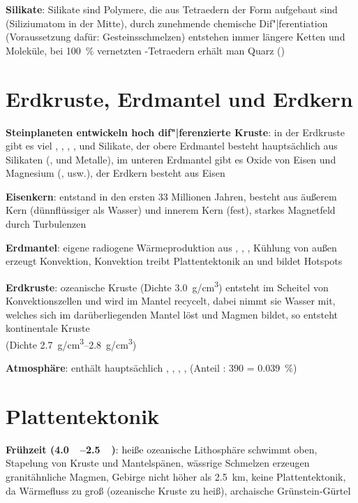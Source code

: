 \textbf{Silikate}:
Silikate sind Polymere, die aus Tetraedern der Form  aufgebaut sind
(Siliziumatom in der Mitte),
durch zunehmende chemische Dif"|ferentiation (Voraussetzung dafür: Gesteinsschmelzen)
entstehen immer längere Ketten und Moleküle,
bei \SI{100}{\percent} vernetzten -Tetraedern erhält man Quarz ()

\section{%
    Erdkruste, Erdmantel und Erdkern%
}

\textbf{Steinplaneten entwickeln hoch dif"|ferenzierte Kruste}:
in der Erdkruste gibt es viel , , , ,  und Silikate,
der obere Erdmantel besteht hauptsächlich aus Silikaten (,  und Metalle),
im unteren Erdmantel gibt es Oxide von Eisen und Magnesium (,  usw.),
der Erdkern besteht aus Eisen

\textbf{Eisenkern}:
entstand in den ersten 33 Millionen Jahren,
besteht aus äußerem Kern (dünnflüssiger als Wasser) und innerem Kern (fest),
starkes Magnetfeld durch Turbulenzen

\textbf{Erdmantel}:
eigene radiogene Wärmeproduktion aus , , ,
Kühlung von außen erzeugt Konvektion,
Konvektion treibt Plattentektonik an und bildet Hotspots

\textbf{Erdkruste}:
ozeanische Kruste (Dichte \SI{3.0}{\gram/\centi\meter\cubed})
entsteht im Scheitel von Konvektionszellen und wird im Mantel recycelt,
dabei nimmt sie Wasser mit, welches sich im darüberliegenden Mantel löst und Magmen bildet,
so entsteht kontinentale Kruste\\
(Dichte \SIrange{2.7}{2.8}{\gram/\centi\meter\cubed})

\textbf{Atmosphäre}:
enthält hauptsächlich , , , , 
(Anteil : \SI{390}{\ppm} = \SI{0.039}{\percent})

\section{%
    Plattentektonik%
}

\textbf{Frühzeit (\SIrange{4.0}{2.5}{\giga\year})}:
heiße ozeanische Lithosphäre schwimmt oben,
Stapelung von Kruste und Mantelspänen,
wässrige Schmelzen erzeugen granitähnliche Magmen,
Gebirge nicht höher als \SI{2.5}{\kilo\meter},
keine Plattentektonik, da Wärmefluss zu groß (ozeanische Kruste zu heiß),
archaische Grünstein-Gürtel

